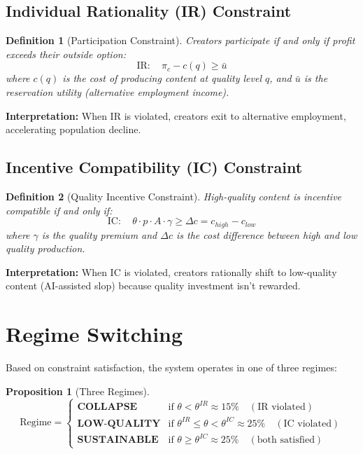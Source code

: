 \documentclass[11pt,a4paper]{article}
\newtheorem{definition}{Definition}
\newtheorem{proposition}{Proposition}
\begin{document}
\subsection{Individual Rationality (IR) Constraint}

\begin{definition}[Participation Constraint]
Creators participate if and only if profit exceeds their outside option:
\begin{equation}
\boxed{
\text{IR}: \quad \pi_c - c(q) \geq \bar{u}
}
\end{equation}
where $c(q)$ is the cost of producing content at quality level $q$, and $\bar{u}$ is the reservation utility (alternative employment income).
\end{definition}

\textbf{Interpretation:} When IR is violated, creators exit to alternative employment, accelerating population decline.

\subsection{Incentive Compatibility (IC) Constraint}

\begin{definition}[Quality Incentive Constraint]
High-quality content is incentive compatible if and only if:
\begin{equation}
\boxed{
\text{IC}: \quad \theta \cdot p \cdot A \cdot \gamma \geq \Delta c = c_{high} - c_{low}
}
\end{equation}
where $\gamma$ is the quality premium and $\Delta c$ is the cost difference between high and low quality production.
\end{definition}

\textbf{Interpretation:} When IC is violated, creators rationally shift to low-quality content (AI-assisted slop) because quality investment isn't rewarded.

\section{Regime Switching}

Based on constraint satisfaction, the system operates in one of three regimes:

\begin{proposition}[Three Regimes]
\begin{equation}
\text{Regime} = \begin{cases}
\textbf{COLLAPSE} & \text{if } \theta < \theta^{IR} \approx 15\% \quad (\text{IR violated})\\[0.5em]
\textbf{LOW-QUALITY} & \text{if } \theta^{IR} \leq \theta < \theta^{IC} \approx 25\% \quad (\text{IC violated})\\[0.5em]
\textbf{SUSTAINABLE} & \text{if } \theta \geq \theta^{IC} \approx 25\% \quad (\text{both satisfied})
\end{cases}
\end{equation}
\end{proposition}
\end{document}
